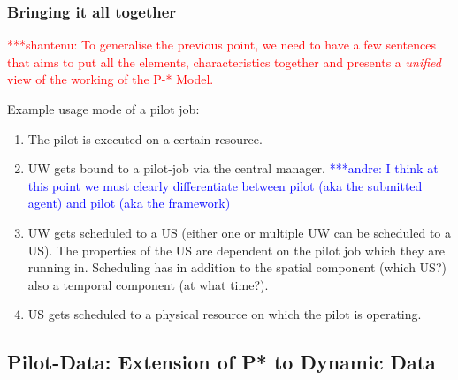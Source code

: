 \documentclass[conference,final]{IEEEtran}
\newcommand{\jhanote}[1]{ {\textcolor{red} { ***shantenu: #1 }}}
\newcommand{\alnote}[1]{ {\textcolor{blue} { ***andre: #1 }}}
\newcommand{\alnote}[1]{}
\newcommand{\jhanote}[1]{}
\begin{document}


\subsubsection*{Bringing it all together}

\jhanote{To generalise the previous point, we need to have a few
  sentences that aims to put all the elements, characteristics
  together and presents a {\it unified} view of the working of the P-*
  Model.}
  
\noindent
Example usage mode of a pilot job:
\begin{enumerate}
    \item The pilot is executed on a certain resource.
    \item UW gets bound to a pilot-job via the central manager. 
    \alnote{I think at this point we must 
    clearly differentiate between pilot (aka the submitted agent) and pilot (aka 
    the framework)}
    \item UW gets scheduled to a US  (either one or multiple UW can be 
     scheduled to a US). The properties of the US are dependent on the pilot job 
     which they are running in. Scheduling has in addition to the spatial 
     component (which US?) also a temporal component (at what time?).
    \item US gets scheduled to a physical resource on which the pilot is 
     operating.
\end{enumerate}



\subsection{Pilot-Data: Extension of P* to Dynamic Data}
\label{sec:pilot-data}



\end{document}
